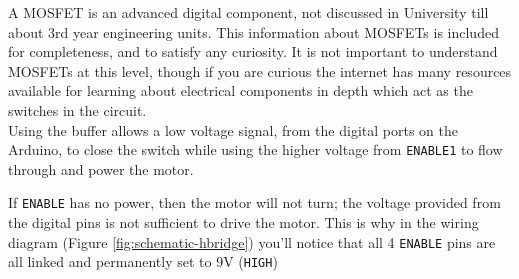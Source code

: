 \documentclass[../TinyBot.tex]{subfiles}
\begin{document}
\begin{center}
    
\end{center}
A MOSFET is an advanced digital component, not discussed in University till about 3rd year engineering units. This information about MOSFETs is included for completeness, and to satisfy any curiosity. It is not important to understand MOSFETs at this level, though if you are curious the internet has many resources available for learning about electrical components in depth which act as the switches in the circuit. \\


Using the buffer allows a low voltage signal, from the digital ports on the Arduino, to close the switch while using the higher voltage from \lstinline[]!ENABLE1! to flow through and power the motor. 


If \lstinline[]!ENABLE! has no power, then the motor will not turn; the voltage provided from the digital pins is not sufficient to drive the motor.  This is why in the wiring diagram (Figure \ref{fig:schematic-hbridge}) you'll notice that all 4 \lstinline[]!ENABLE! pins are all linked and permanently set to 9V (\lstinline[]!HIGH!) \\
\end{document}
